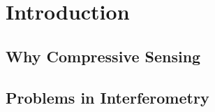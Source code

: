 \section{Introduction}\label{intro}

\subsection{Why Compressive Sensing}

\subsection{Problems in Interferometry}